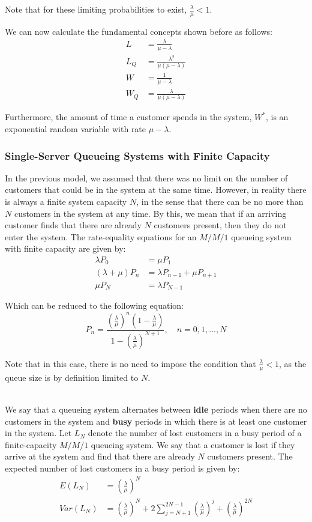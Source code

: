 \documentclass[12pt]{article}
\begin{document}
\noindent
Note that for these limiting probabilities to exist, $\frac{\lambda}{\mu} < 1$.

\newpage
\noindent
We can now calculate the fundamental concepts shown before as follows:
\begin{align*}
    L &= \frac{\lambda}{\mu - \lambda} \\
    L_Q &= \frac{\lambda^2}{\mu(\mu - \lambda)} \\
    W &= \frac{1}{\mu - \lambda} \\
    W_Q &= \frac{\lambda}{\mu(\mu - \lambda)}
\end{align*}

\noindent
Furthermore, the amount of time a customer spends in the system, $W^*$, is an exponential random variable with rate $\mu - \lambda$.

\subsubsection{Single-Server Queueing Systems with Finite Capacity}
In the previous model, we assumed that there was no limit on the number of customers that could be in the system at the same time.
However, in reality there is always a finite system capacity $N$, in the sense that there can be no more than $N$ customers in the system at any time.
By this, we mean that if an arriving customer finds that there are already $N$ customers present, then they do not enter the system.
The rate-equality equations for an $M/M/1$ queueing system with finite capacity are given by:
\begin{align*}
    \lambda P_0 &= \mu P_1 \\
    (\lambda + \mu)P_n &= \lambda P_{n - 1} + \mu P_{n + 1} \\
    \mu P_N &= \lambda P_{N - 1}
\end{align*}

\noindent
Which can be reduced to the following equation:
\[ P_n = \frac{\left( \frac{\lambda}{\mu} \right)^n \left( 1 - \frac{\lambda}{\mu} \right)}{1 - \left( \frac{\lambda}{\mu} \right)^{N + 1}}, \quad n = 0, 1, ... , N \]

\noindent
Note that in this case, there is no need to impose the condition that $\frac{\lambda}{\mu} < 1$, as the queue size is by definition limited to $N$.

\noindent
\\
We say that a queueing system alternates between \textbf{idle} periods when there are no customers in the system and \textbf{busy} periods in which there is at least one customer in the system.
Let $L_N$ denote the number of lost customers in a busy period of a finite-capacity $M/M/1$ queueing system.
We say that a customer is lost if they arrive at the system and find that there are already $N$ customers present.
The expected number of lost customers in a busy period is given by:
\begin{align*}
    E(L_N) &= \left( \frac{\lambda}{\mu} \right)^N \\
    Var(L_N) &= \left( \frac{\lambda}{\mu} \right)^N + 2 \sum_{j = N + 1}^{2N - 1} \left( \frac{\lambda}{\mu} \right)^j + \left( \frac{\lambda}{\mu} \right)^{2N}
\end{align*}
\end{document}
